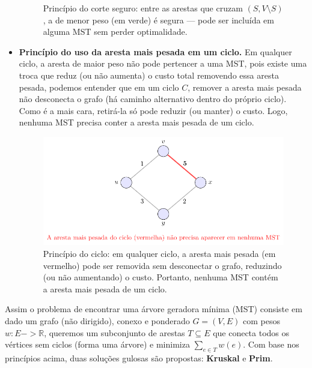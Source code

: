 \documentclass[12pt,a4paper]{article}
\def\emph#1{#1}%
\def\to{->}%
\begin{document}
\begin{itemize}
\begin{figure}[H]
              \caption{Princípio do corte seguro: entre as arestas que cruzam \((S, V\setminus S)\), a de menor peso (em verde) é \emph{segura} — pode ser incluída em alguma MST sem perder optimalidade.}
              \label{fig:mst-cut-safe}
          \end{figure}
    \item \textbf{Princípio do uso da aresta mais pesada em um ciclo.} Em qualquer \emph{ciclo}, a aresta de maior peso \emph{não} pode pertencer a uma MST, pois existe uma troca que reduz (ou não aumenta) o custo total removendo essa aresta pesada, podemos entender que em um ciclo \(C\), remover a aresta \emph{mais pesada} não desconecta o grafo (há caminho alternativo dentro do próprio ciclo). Como é a mais cara, retirá-la só pode reduzir (ou manter) o custo. Logo, nenhuma MST precisa conter a aresta mais pesada de um ciclo.


          \begin{figure}[H]
              \centering
              \includegraphics[width=0.9\linewidth]{figures/fig_mst_cycle_heavy.pdf}

              \caption{Princípio do ciclo: em qualquer ciclo, a aresta mais pesada (em vermelho) pode ser removida sem desconectar o grafo, reduzindo (ou não aumentando) o custo. Portanto, nenhuma MST contém a aresta mais pesada de um ciclo.}
              \label{fig:mst-cycle-heavy}\end{figure}

\end{itemize}

Assim o problema de encontrar uma árvore geradora mínima (MST) consiste em dado um grafo (não dirigido), conexo e ponderado \(G=(V,E)\) com pesos \(w:E\to\mathbb{R}\), queremos um subconjunto de arestas \(T\subseteq E\) que conecta todos os vértices sem ciclos (forma uma árvore) e minimiza \(\sum_{e\in T} w(e)\).
Com base nos princípios acima, duas soluções gulosas são propostas: \textbf{Kruskal} e \textbf{Prim}.
\end{document}
